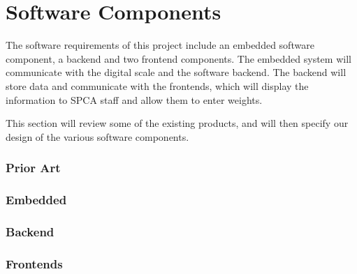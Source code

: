 
\chapter{Software Components}

The software requirements of this project include an embedded software component, a backend and two frontend components. The embedded system will communicate with the digital scale and the software backend. The backend will store data and communicate with the frontends, which will display the information to SPCA staff and allow them to enter weights. 

This section will review some of the existing products, and will then specify our design of the various software components.

\subsection{Prior Art}

\subsection{Embedded}

\subsection{Backend}

\subsection{Frontends}
